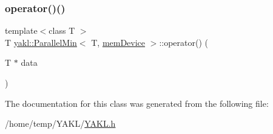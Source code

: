 \mbox{\label{classyakl_1_1ParallelMin_3_01T_00_01memDevice_01_4_ab0aa323eb3332089954b0d2941383cb5}} 
\subsubsection{\texorpdfstring{operator()()}{operator()()}}
{\footnotesize\ttfamily template$<$class T $>$ \\
T \hyperlink{classyakl_1_1ParallelMin}{yakl\+::\+Parallel\+Min}$<$ T, \hyperlink{namespaceyakl_ac3c32aec58c61e7f870081477ceee883}{mem\+Device} $>$\+::operator() (\begin{DoxyParamCaption}\item[{T $\ast$}]{data }\end{DoxyParamCaption})\hspace{0.3cm}{\ttfamily [inline]}}



The documentation for this class was generated from the following file\+:\begin{DoxyCompactItemize}
\item 
/home/temp/\+Y\+A\+K\+L/\hyperlink{YAKL_8h}{Y\+A\+K\+L.\+h}\end{DoxyCompactItemize}
